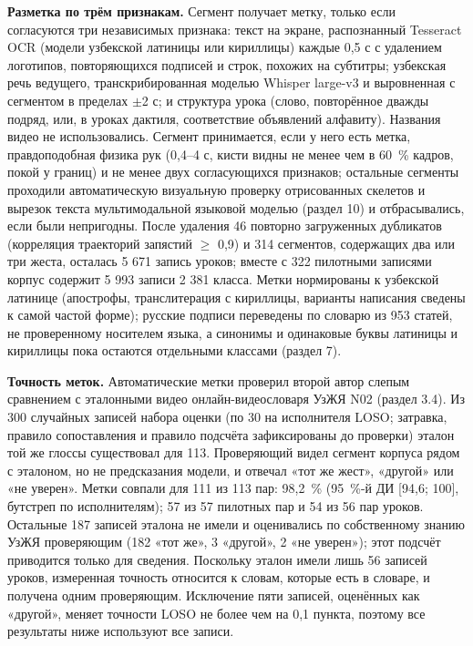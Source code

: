 \documentclass[a4paper,fleqn]{cas-dc}
\begin{document}
\textbf{Разметка по трём признакам.} Сегмент получает метку, только если согласуются три независимых признака: текст на экране, распознанный Tesseract OCR \cite{2007_smith_tesseract} (модели узбекской латиницы или кириллицы) каждые 0,5 с с удалением логотипов, повторяющихся подписей и строк, похожих на субтитры; узбекская речь ведущего, транскрибированная моделью Whisper large-v3 \cite{2023_radford_whisper} и выровненная с сегментом в пределах $\pm$2 с; и структура урока (слово, повторённое дважды подряд, или, в уроках дактиля, соответствие объявлений алфавиту). Названия видео не использовались. Сегмент принимается, если у него есть метка, правдоподобная физика рук (0,4--4 с, кисти видны не менее чем в 60~\% кадров, покой у границ) и не менее двух согласующихся признаков; остальные сегменты проходили автоматическую визуальную проверку отрисованных скелетов и вырезок текста мультимодальной языковой моделью (раздел 10) и отбрасывались, если были непригодны. После удаления 46 повторно загруженных дубликатов (корреляция траекторий запястий $\geq$ 0,9) и 314 сегментов, содержащих два или три жеста, осталась 5 671 запись уроков; вместе с 322 пилотными записями корпус содержит 5 993 записи 2 381 класса. Метки нормированы к узбекской латинице (апострофы, транслитерация с кириллицы, варианты написания сведены к самой частой форме); русские подписи переведены по словарю из 953 статей, не проверенному носителем языка, а синонимы и одинаковые буквы латиницы и кириллицы пока остаются отдельными классами (раздел 7).

\textbf{Точность меток.} Автоматические метки проверил второй автор слепым сравнением с эталонными видео онлайн-видеословаря УзЖЯ N02 (раздел 3.4). Из 300 случайных записей набора оценки (по 30 на исполнителя LOSO; затравка, правило сопоставления и правило подсчёта зафиксированы до проверки) эталон той же глоссы существовал для 113. Проверяющий видел сегмент корпуса рядом с эталоном, но не предсказания модели, и отвечал «тот же жест», «другой» или «не уверен». Метки совпали для 111 из 113 пар: 98,2~\% (95~\%-й ДИ {[}94,6; 100{]}, бутстреп по исполнителям); 57 из 57 пилотных пар и 54 из 56 пар уроков. Остальные 187 записей эталона не имели и оценивались по собственному знанию УзЖЯ проверяющим (182 «тот же», 3 «другой», 2 «не уверен»); этот подсчёт приводится только для сведения. Поскольку эталон имели лишь 56 записей уроков, измеренная точность относится к словам, которые есть в словаре, и получена одним проверяющим. Исключение пяти записей, оценённых как «другой», меняет точности LOSO не более чем на 0,1 пункта, поэтому все результаты ниже используют все записи.
\end{document}
